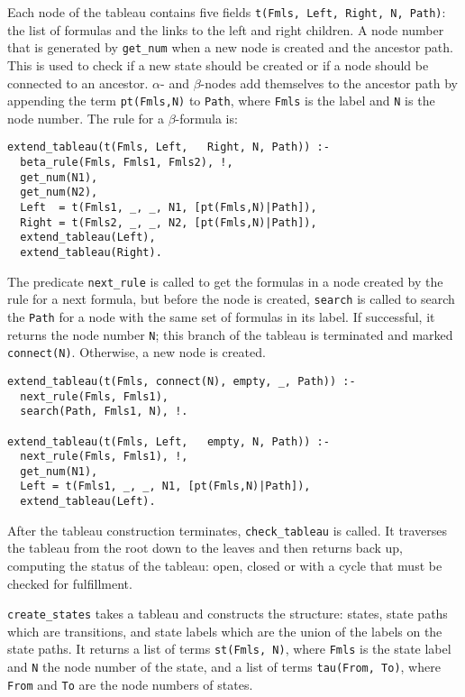 \documentclass[11pt]{article}
\newcommand*{\p}[1]{\textup{\texttt{#1}}}
\begin{document}
Each node of the tableau contains five fields \p{t(Fmls, Left, Right, N,
Path)}: the list of formulas and the links to the left and right
children. A node number that is generated by \p{get\_num} when a new
node is created and the ancestor path. This is used to check if a new
state should be created or if a node should be connected to an ancestor.
$\alpha$- and $\beta$-nodes add themselves to the ancestor path by
appending the term \p{pt(Fmls,N)} to \p{Path}, where \p{Fmls} is the
label and \p{N} is the node number. The rule for a $\beta$-formula is:

\begin{verbatim}
extend_tableau(t(Fmls, Left,   Right, N, Path)) :-
  beta_rule(Fmls, Fmls1, Fmls2), !,
  get_num(N1),
  get_num(N2),
  Left  = t(Fmls1, _, _, N1, [pt(Fmls,N)|Path]),
  Right = t(Fmls2, _, _, N2, [pt(Fmls,N)|Path]),
  extend_tableau(Left),
  extend_tableau(Right).
\end{verbatim}

The predicate \p{next\_rule} is called to get the formulas in a node
created by the rule for a next formula, but before the node is
created, \p{search} is called to search the \p{Path} for a node with the
same set of formulas in its label. If successful, it returns the node
number \p{N}; this branch of the tableau is terminated and marked
\p{connect(N)}. Otherwise, a new node is created.

\begin{verbatim}
extend_tableau(t(Fmls, connect(N), empty, _, Path)) :-
  next_rule(Fmls, Fmls1),
  search(Path, Fmls1, N), !.

extend_tableau(t(Fmls, Left,   empty, N, Path)) :-
  next_rule(Fmls, Fmls1), !,
  get_num(N1),
  Left = t(Fmls1, _, _, N1, [pt(Fmls,N)|Path]),
  extend_tableau(Left).
\end{verbatim}

After the tableau construction terminates, \p{check\_tableau} is called.
It traverses the tableau from the root down to the leaves and then
returns back up, computing the status of the tableau: open, closed or
with a cycle that must be checked for fulfillment.

\p{create\_states} takes a tableau and constructs the structure: states,
state paths which are transitions, and state labels which are the union
of the labels on the state paths. It returns a list of terms
\p{st(Fmls,~N)}, where \p{Fmls} is the state label and \p{N} the node
number of the state, and a list of terms \p{tau(From,~To)}, where
\p{From} and \p{To} are the node numbers of states.
\end{document}
